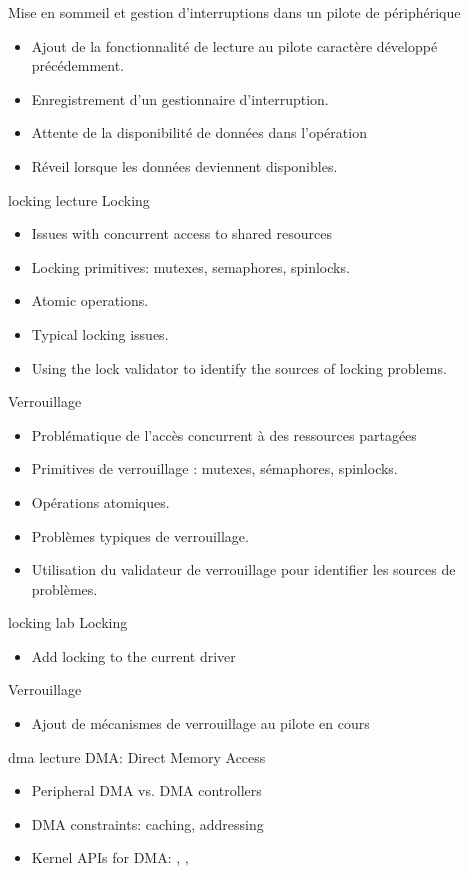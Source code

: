 {Mise en sommeil et gestion d'interruptions dans un pilote de périphérique}
{
  \begin{itemize}
  \item Ajout de la fonctionnalité de lecture au pilote caractère développé
    précédemment.
  \item Enregistrement d'un gestionnaire d'interruption.
  \item Attente de la disponibilité de données dans l'opération 
  \item Réveil lorsque les données deviennent disponibles.
  \end{itemize}
}
{locking}
{lecture}
{Locking}
{
  \begin{itemize}
  \item Issues with concurrent access to shared resources
  \item Locking primitives: mutexes, semaphores, spinlocks.
  \item Atomic operations.
  \item Typical locking issues.
  \item Using the lock validator to identify the sources of locking
    problems.
  \end{itemize}
}
{Verrouillage}
{
  \begin{itemize}
  \item Problématique de l'accès concurrent à des ressources partagées
  \item Primitives de verrouillage : mutexes, sémaphores, spinlocks.
  \item Opérations atomiques.
  \item Problèmes typiques de verrouillage.
  \item Utilisation du validateur de verrouillage pour identifier les
    sources de problèmes.
  \end{itemize}
}
{locking}
{lab}
{Locking}
{
  \begin{itemize}
  \item Add locking to the current driver
  \end{itemize}
}
{Verrouillage}
{
  \begin{itemize}
  \item Ajout de mécanismes de verrouillage au pilote en cours
  \end{itemize}
}
{dma}
{lecture}
{DMA: Direct Memory Access}
{
  \begin{itemize}
  \item Peripheral DMA vs. DMA controllers
  \item DMA constraints: caching, addressing
  \item Kernel APIs for DMA: , , 
  \end{itemize}
}
